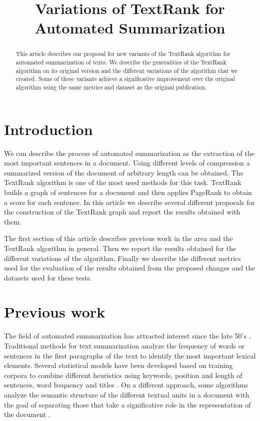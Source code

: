 \documentclass{llncs}
\begin{document}
\frontmatter

\title{Variations of TextRank for Automated Summarization}


\maketitle

\begin{abstract}
This article describes our proposal for new variants of the TextRank algorithm for automated summarization of texts. We describe the generalities of the TextRank algorithm on its original version and the different variations of the algorithm that we created. Some of these variants achieve a significative improvement over the original algorithm using the same metrics and dataset as the original publication. 

\end{abstract}

\section{Introduction}
We can describe the process of automated summarization as the extraction of the most important sentences in a document. Using different levels of compression a summarized version of the document of arbitrary length can be obtained. The TextRank algorithm is one of the most used methods for this task. TextRank builds a graph of sentences for a document and then applies PageRank to obtain a score for each sentence. In this article we describe several different proposals for the construction of the TextRank graph and report the results obtained with them.

The first section of this article describes previous work in the area and the TextRank algorithm in general. Then we report the results obtained for the different variations of the algorithm. Finally we describe the different metrics used for the evaluation of the results obtained from the proposed changes and the datasets used for these tests.

\section{Previous work}
The field of automated summarization has attracted interest since the late 50's \cite{luhn}. Traditional methods for text summarization analyze the frequency of words or sentences in the first paragraphs of the text to identify the most important lexical elements. Several statistical models have been developed based on training corpora to combine different heuristics using keywords, position and length of sentences, word frequency and titles \cite{hovy}. On a different approach, some algorithms analyze the semantic structure of the different textual units in a document with the goal of separating those that take a significative role in the representation of the document \cite{marcu}.
\end{document}

